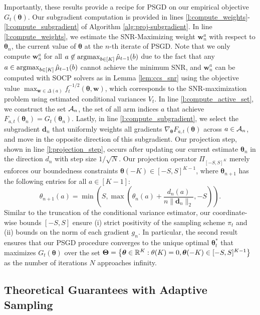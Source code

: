 \documentclass{article}
\begin{document}
Importantly, these results provide a recipe for PSGD on our empirical objective $G_t(\bm{\theta})$. Our subgradient computation is provided in lines \ref{l:compute_weights}-\ref{l:compute_subgradient} of Algorithm \ref{alg:proj-subgradient}. In line \ref{l:compute_weights}, we estimate the SNR-Maximizing weight $\bm{w}_n^a$ with respect to $\bm{\theta}_n$, the current value of $\bm{\theta}$ at the $n$-th iterate of PSGD. Note that we only compute $\bm{w}_n^a$ for all $a \not\in \argmax_{b \in [K]}\hat\mu_{t-1}(b)$ due to the fact that any $a \in \argmax_{b \in [K]}\hat\mu_{t-1}(b)$ cannot achieve the minimum SNR, and $\bm{w}_n^a$ can be computed with SOCP solvers as in Lemma \ref{lem:ccs_snr} using the objective value $\max_{\bm{w} \in \Delta(a)}f_t^{-1/2}(\bm\theta, \bm{w})$, which corresponds to the SNR-maximization problem using estimated conditional variances $V_t$. In line \ref{l:compute_active_set}, we construct the set $\mathcal{A}_n$, the set of all arm indices $a$ that achieve $F_{a,t}(\bm{\theta}_n) = G_t(\bm{\theta}_n)$. Lastly, in line \ref{l:compute_subgradient}, we select the subgradient $\bm{d}_n$ that uniformly weights all gradients $\nabla_{\bm\theta}F_{a,t}(\bm{\theta})$ across $a \in \mathcal{A}_n$, and move in the opposite direction of this subgradient. Our projection step, shown in line \ref{l:projection_step}, occurs after updating our current estimate $\bm{\theta}_n$ in the direction $d_n$ with step size $1/\sqrt{N}$. Our projection operator $\Pi_{[-S, S]^K}$ merely enforces our boundedness constraints $\bm{\theta}(-K) \in [-S, S]^{K-1}$, where $\bm{\theta}_{n+1}$ has the following entries for all $a \in [K-1]$:
\begin{equation}
    \theta_{n+1}(a) = \min\left(S, \max\left({\theta}_n(a) + \frac{d_n(a)}{n \| \bm{d}_n \|_2}, -S \right)\right). 
\end{equation}
Similar to the truncation of the conditional variance estimator, our coordinate-wise bounds $[-S, S]$ ensure (i) strict positivity of the sampling scheme $\pi_t$ and (ii) bounds on the norm of each gradient $g_n$. In particular, the second result ensures that our PSGD procedure converges to the unique optimal $\bm{\theta}_t^*$ that maximizes $G_t(\bm{\theta})$ over the set $\boldsymbol{\Theta} = \left\{\boldsymbol{\theta} \in \mathbb{R}^K: \theta(K) = 0, \boldsymbol{\theta}(-K) \in [-S,S]^{K-1}\right\}$ as the number of iterations $N$ approaches infinity.



\subsection{Theoretical Guarantees with Adaptive Sampling}\label{subsec:theoretical_guarantees}
\end{document}
